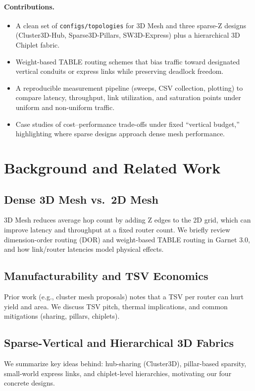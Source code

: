 \documentclass[11pt]{article}
\newcommand{\Ruby}{Garnet 3.0}
\begin{document}
\paragraph{Contributions.}
\begin{itemize}[leftmargin=1.2em]
  \item A clean set of \texttt{configs/topologies} for 3D Mesh and three sparse-Z designs (Cluster3D-Hub, Sparse3D-Pillars, SW3D-Express) plus a hierarchical 3D Chiplet fabric.
  \item Weight-based TABLE routing schemes that bias traffic toward designated vertical conduits or express links while preserving deadlock freedom.
  \item A reproducible measurement pipeline (sweeps, CSV collection, plotting) to compare latency, throughput, link utilization, and saturation points under uniform and non-uniform traffic.
  \item Case studies of cost--performance trade-offs under fixed ``vertical budget,'' highlighting where sparse designs approach dense mesh performance.
\end{itemize}

\section{Background and Related Work}
\subsection{Dense 3D Mesh vs.\ 2D Mesh}
3D Mesh reduces average hop count by adding Z edges to the 2D grid, which can improve latency and throughput at a fixed router count. We briefly review dimension-order routing (DOR) and weight-based TABLE routing in \Ruby, and how link/router latencies model physical effects.

\subsection{Manufacturability and TSV Economics}
Prior work (e.g., cluster mesh proposals) notes that a TSV per router can hurt yield and area. We discuss TSV pitch, thermal implications, and common mitigations (sharing, pillars, chiplets).

\subsection{Sparse-Vertical and Hierarchical 3D Fabrics}
We summarize key ideas behind: hub-sharing (Cluster3D), pillar-based sparsity, small-world express links, and chiplet-level hierarchies, motivating our four concrete designs.
\end{document}
